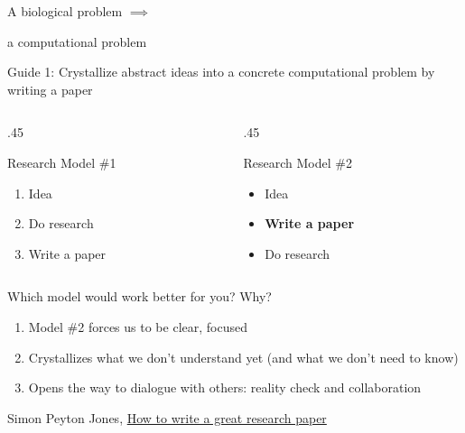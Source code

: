 \documentclass[
  12pt,
  ignorenonframetext,
  aspectratio=169]{beamer}
\providecommand{\tightlist}{%
  \setlength{\itemsep}{0pt}\setlength{\parskip}{0pt}}
\begin{document}
\begin{frame}{}
\protect{}\label{section}
\huge

A biological problem \(\implies\)

\flushright

a computational problem

\normalsize
\end{frame}

\begin{frame}{Guide 1: Crystallize abstract ideas into a concrete
computational problem by writing a paper}
\protect{}\label{guide-1-crystallize-abstract-ideas-into-a-concrete-computational-problem-by-writing-a-paper}
\begin{columns}[T]
\begin{column}{.45\linewidth}
\begin{block}{Research Model \#1}
\protect{}\label{research-model-1}
\begin{enumerate}
\tightlist
\item
  Idea
\item
  Do research
\item
  Write a paper
\end{enumerate}
\end{block}
\end{column}

\begin{column}{.45\linewidth}
\begin{block}{Research Model \#2}
\protect{}\label{research-model-2}
\begin{itemize}
\tightlist
\item
  Idea
\item
  \textbf{Write a paper}
\item
  Do research
\end{itemize}
\end{block}
\end{column}
\end{columns}

Which model would work better for you? Why?


\vfill

\normalsize

\begin{enumerate}
\item<3-> Model \#2 forces us to be clear, focused
\item<3-> Crystallizes what we don’t understand yet (and what we don't need to know)
\item<3-> Opens the way to dialogue with others: reality check and collaboration
\end{enumerate}

\tiny

Simon Peyton Jones,
\href{https://www.microsoft.com/en-us/research/wp-content/uploads/2016/07/How-to-write-a-great-research-paper.pdf}{How
to write a great research paper}

\normalsize
\end{frame}
\end{document}
